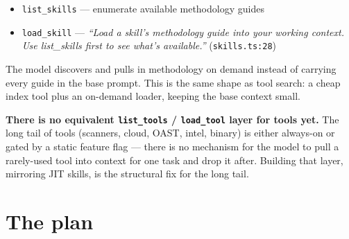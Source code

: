 \documentclass[11pt]{article}
\begin{document}
\begin{itemize}[leftmargin=*]
  \item \texttt{list\_skills} --- enumerate available methodology guides
  \item \texttt{load\_skill} --- \textit{``Load a skill's methodology guide into
  your working context. Use list\_skills first to see what's available.''}
  (\texttt{skills.ts:28})
\end{itemize}

The model discovers and pulls in methodology on demand instead of carrying every
guide in the base prompt. This is the same shape as tool search: a cheap index
tool plus an on-demand loader, keeping the base context small.

\textbf{There is no equivalent \texttt{list\_tools} / \texttt{load\_tool} layer
for tools yet.} The long tail of tools (scanners, cloud, OAST, intel, binary) is
either always-on or gated by a static feature flag --- there is no mechanism for
the model to pull a rarely-used tool into context for one task and drop it after.
Building that layer, mirroring JIT skills, is the structural fix for the long
tail.

\section{The plan}
\end{document}
